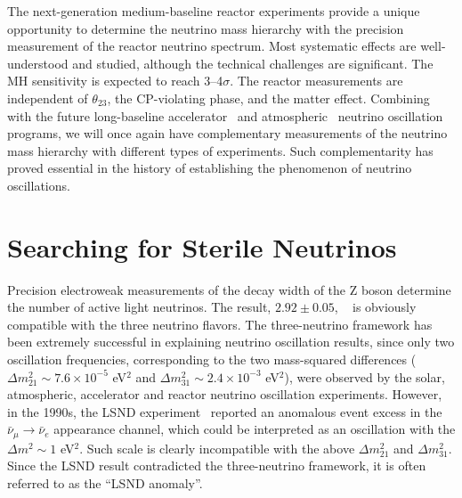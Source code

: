 \documentclass[aps,twocolumn,preprintnumbers,amsmath,superscriptaddress,amssymb,floats,nofootinbib]{revtex4-1}
\begin{document}
The next-generation medium-baseline reactor experiments provide a unique opportunity to determine the neutrino mass hierarchy with the precision measurement of the reactor neutrino spectrum.
Most systematic effects are well-understood and studied, although the technical challenges are significant. 
The MH sensitivity is expected to reach 3--4$\sigma$.
The reactor measurements are independent of $\theta_{23}$, the CP-violating phase, and the matter effect.
Combining with the future long-baseline accelerator~\cite{LBNE,LBNO} and atmospheric~\cite{PINGU,ORCA} neutrino oscillation programs, we will once again have complementary measurements of the neutrino mass hierarchy with different types of experiments. 
Such complementarity has proved essential in the history of establishing the phenomenon of neutrino oscillations.


\section{Searching for Sterile Neutrinos}

Precision electroweak measurements of the decay width of the Z boson
determine the number of active light neutrinos. The result, $2.92 \pm 0.05$,  ~\cite{EW-2005} is obviously compatible with the three neutrino flavors.
The three-neutrino framework has been extremely successful in explaining neutrino oscillation results, since only two oscillation frequencies, corresponding to the two mass-squared differences 
($\Delta m_{21}^2\sim7.6\times10^{-5}$ eV$^2$ and $\Delta m_{31}^2 \sim2.4\times10^{-3}$ eV$^2$), 
were observed by the solar, atmospheric, accelerator and reactor neutrino oscillation experiments. 
However, in the 1990s, the LSND experiment~\cite{LSND1995,LSND2001} reported an anomalous 
event excess in the $\bar\nu_\mu\rightarrow\bar\nu_e$ appearance channel, which could be interpreted as an oscillation with the $\Delta m^2\sim1$ eV$^2$.
Such scale is clearly incompatible with the above $\Delta m_{21}^2$ and $\Delta m_{31}^2$.
Since the LSND result contradicted the three-neutrino framework, it is often referred to as the ``LSND anomaly''.
\end{document}
